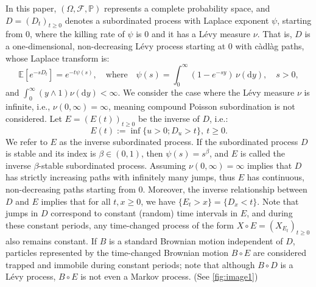 \documentclass[10pt,reqno,final]{amsart}
\theoremstyle{plain}
\theoremstyle{definition}
\theoremstyle{remark}
\numberwithin{equation}{section}
\numberwithin{figure}{section}
\numberwithin{table}{section}
\begin{document}
In this paper, $(\Omega,\mathcal{F},\mathbb{P})$ represents a complete probability space, and $D=(D_t)_{t \geq 0}$ denotes a subordinated process with Laplace exponent $\psi$, starting from 0, where the killing rate of $\psi$ is 0 and it has a Lévy measure $\nu$. That is, $D$ is a one-dimensional, non-decreasing Lévy process starting at 0 with càdlàg paths, whose Laplace transform is:
$$
\mathbb{E}[e^{-sD_t}] = e^{-t\psi(s)}, \quad \text{where} \quad \psi(s) = \int_0^\infty (1 - e^{-sy}) \, \nu(\text{d}y), \quad s > 0,
$$
and $\int_0^\infty (y \wedge 1) \nu(\text{d}y) < \infty$. We consider the case where the Lévy measure $\nu$ is infinite, i.e., $\nu(0, \infty) = \infty$, meaning compound Poisson subordination is not considered. Let $E=(E(t))_{t \geq 0}$ be the inverse of $D$, i.e.:
$$
E(t) := \inf \{ u > 0; D_u > t \}, \: t \geq 0.
$$
We refer to \( E \) as the inverse subordinated process. If the subordinated process \(D\) is stable and its index is \(\beta \in (0,1)\), then \(\psi(s) = s^{\beta}\), and \(E\) is called the inverse \(\beta\)-stable subordinated process. Assuming \(\nu(0, \infty) = \infty\) implies that \(D\) has strictly increasing paths with infinitely many jumps, thus \(E\) has continuous, non-decreasing paths starting from 0. Moreover, the inverse relationship between \(D\) and \(E\) implies that for all \(t, x \geq 0\), we have $\{E_t > x\} = \{D_x < t\}$. Note that jumps in \(D\) correspond to constant (random) time intervals in \(E\), and during these constant periods, any time-changed process of the form \(X \circ E = (X_{E_t})_{t \geq 0}\) also remains constant. If \(B\) is a standard Brownian motion independent of \(D\), particles represented by the time-changed Brownian motion \(B \circ E\) are considered trapped and immobile during constant periods; note that although \(B \circ D\) is a Lévy process, \(B \circ E\) is not even a Markov process. (See \cref{fig:image1})
\end{document}
